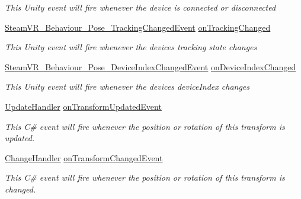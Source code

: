 \begin{DoxyCompactItemize}
\begin{DoxyCompactList}\small\item\em This Unity event will fire whenever the device is connected or disconnected \end{DoxyCompactList}\item 
\mbox{\hyperlink{class_valve_1_1_v_r_1_1_steam_v_r___behaviour___pose___tracking_changed_event}{Steam\+V\+R\+\_\+\+Behaviour\+\_\+\+Pose\+\_\+\+Tracking\+Changed\+Event}} \mbox{\hyperlink{class_valve_1_1_v_r_1_1_steam_v_r___behaviour___pose_ab6c888d7509d753ee3542eac9de67f85}{on\+Tracking\+Changed}}
\begin{DoxyCompactList}\small\item\em This Unity event will fire whenever the device\textquotesingle{}s tracking state changes \end{DoxyCompactList}\item 
\mbox{\hyperlink{class_valve_1_1_v_r_1_1_steam_v_r___behaviour___pose___device_index_changed_event}{Steam\+V\+R\+\_\+\+Behaviour\+\_\+\+Pose\+\_\+\+Device\+Index\+Changed\+Event}} \mbox{\hyperlink{class_valve_1_1_v_r_1_1_steam_v_r___behaviour___pose_a99f240404e0a47b614cb20246c395e47}{on\+Device\+Index\+Changed}}
\begin{DoxyCompactList}\small\item\em This Unity event will fire whenever the device\textquotesingle{}s device\+Index changes \end{DoxyCompactList}\item 
\mbox{\hyperlink{class_valve_1_1_v_r_1_1_steam_v_r___behaviour___pose_af2fee0ef3ee6fee2917805bb050216c2}{Update\+Handler}} \mbox{\hyperlink{class_valve_1_1_v_r_1_1_steam_v_r___behaviour___pose_ad30505e3fea17998a4137dd2d987f65f}{on\+Transform\+Updated\+Event}}
\begin{DoxyCompactList}\small\item\em This C\# event will fire whenever the position or rotation of this transform is updated. \end{DoxyCompactList}\item 
\mbox{\hyperlink{class_valve_1_1_v_r_1_1_steam_v_r___behaviour___pose_abfdfc35f49754198589572579c59bcc2}{Change\+Handler}} \mbox{\hyperlink{class_valve_1_1_v_r_1_1_steam_v_r___behaviour___pose_a2118c47de64b77f157864fb337bdee8b}{on\+Transform\+Changed\+Event}}
\begin{DoxyCompactList}\small\item\em This C\# event will fire whenever the position or rotation of this transform is changed. \end{DoxyCompactList}\item 

\end{DoxyCompactItemize}
